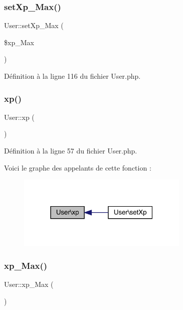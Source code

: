 \subsubsection{\texorpdfstring{set\+Xp\+\_\+\+Max()}{setXp\_Max()}}
{\footnotesize\ttfamily User\+::set\+Xp\+\_\+\+Max (\begin{DoxyParamCaption}\item[{}]{\$xp\+\_\+\+Max }\end{DoxyParamCaption})}



Définition à la ligne 116 du fichier User.\+php.

\mbox{\label{class_user_abc7ddb8ce5c319d13e15734bee03075b}} 
\subsubsection{\texorpdfstring{xp()}{xp()}}
{\footnotesize\ttfamily User\+::xp (\begin{DoxyParamCaption}{ }\end{DoxyParamCaption})}



Définition à la ligne 57 du fichier User.\+php.

Voici le graphe des appelants de cette fonction \+:\nopagebreak
\begin{figure}[H]
\begin{center}
\leavevmode
\includegraphics[width=232pt]{class_user_abc7ddb8ce5c319d13e15734bee03075b_icgraph}
\end{center}
\end{figure}
\mbox{\label{class_user_a2826726689d756f84814487cf2823040}} 
\subsubsection{\texorpdfstring{xp\+\_\+\+Max()}{xp\_Max()}}
{\footnotesize\ttfamily User\+::xp\+\_\+\+Max (\begin{DoxyParamCaption}{ }\end{DoxyParamCaption})}



